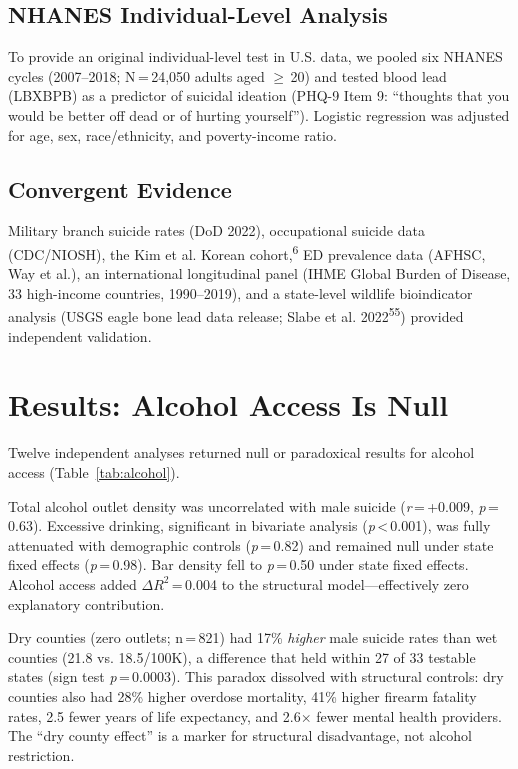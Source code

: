 \documentclass[11pt,twocolumn]{article}
\begin{document}
\subsection{NHANES Individual-Level Analysis}
To provide an original individual-level test in U.S. data, we pooled six NHANES cycles (2007--2018; N\,=\,24,050 adults aged $\geq$\,20) and tested blood lead (LBXBPB) as a predictor of suicidal ideation (PHQ-9 Item 9: ``thoughts that you would be better off dead or of hurting yourself''). Logistic regression was adjusted for age, sex, race/ethnicity, and poverty-income ratio.

\subsection{Convergent Evidence}
Military branch suicide rates (DoD 2022), occupational suicide data (CDC/NIOSH), the Kim et al. Korean cohort,\textsuperscript{6} ED prevalence data (AFHSC, Way et al.), an international longitudinal panel (IHME Global Burden of Disease, 33 high-income countries, 1990--2019), and a state-level wildlife bioindicator analysis (USGS eagle bone lead data release; Slabe et al. 2022\textsuperscript{55}) provided independent validation.


\section{Results: Alcohol Access Is Null}

Twelve independent analyses returned null or paradoxical results for alcohol access (Table~\ref{tab:alcohol}).

Total alcohol outlet density was uncorrelated with male suicide (\textit{r}\,=\,+0.009, \textit{p}\,=\,0.63). Excessive drinking, significant in bivariate analysis (\textit{p}\,<\,0.001), was fully attenuated with demographic controls (\textit{p}\,=\,0.82) and remained null under state fixed effects (\textit{p}\,=\,0.98). Bar density fell to \textit{p}\,=\,0.50 under state fixed effects. Alcohol access added $\Delta R^2$\,=\,0.004 to the structural model---effectively zero explanatory contribution.

Dry counties (zero outlets; n\,=\,821) had 17\% \textit{higher} male suicide rates than wet counties (21.8 vs. 18.5/100K), a difference that held within 27 of 33 testable states (sign test \textit{p}\,=\,0.0003). This paradox dissolved with structural controls: dry counties also had 28\% higher overdose mortality, 41\% higher firearm fatality rates, 2.5 fewer years of life expectancy, and 2.6$\times$ fewer mental health providers. The ``dry county effect'' is a marker for structural disadvantage, not alcohol restriction.
\end{document}
